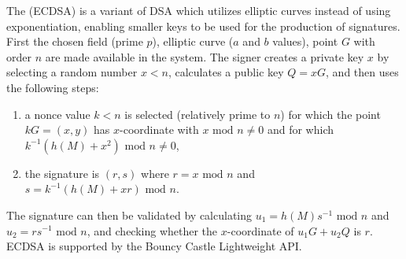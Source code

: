 The  (ECDSA) is a variant of DSA
which utilizes elliptic curves instead of using exponentiation, enabling smaller
keys to be used for the production of signatures.
First the chosen field (prime $p$), elliptic curve ($a$ and $b$ values),
point $G$ with order $n$ are made available in the system.
The signer creates a private key $x$ by selecting a random number $x<n$,
calculates a public key $Q=xG$, and then uses the following steps:
\begin{enumerate}
  \item a nonce value $k<n$ is selected (relatively prime to $n$)
  for which the point $kG=(x,y)$ has $x$-coordinate with $x\mbox{ mod }n\neq0$ and
  for which $k^{-1}\left(h(M)+x^2\right)\mbox{ mod }n\neq0$,
  \item the signature is $(r,s)$ where $r=x\mbox{ mod }n$ and
  $s=k^{-1}\left(h(M)+xr\right)\mbox{ mod }n$.
\end{enumerate}
The signature can then be validated by calculating
$u_1=h(M)s^{-1}\mbox{ mod }n$ and $u_2=r s^{-1}\mbox{ mod }n$,
and checking whether the $x$-coordinate of $u_1G+u_2Q$ is $r$.
ECDSA is supported by the Bouncy Castle Lightweight API.

